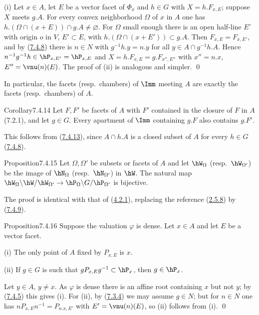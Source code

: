 \documentclass[12pt,a4paper,oneside,english]{smfart}
\makeatletter
\newcommand{\btanchor}[1]{\leavevmode\Hy@raisedlink{\hypertarget{bt:#1}{}}}
\newcommand{\btref}[1]{\hyperlink{bt:#1}{#1}}
\theoremstyle{definition}
\theoremstyle{bt}
\makeatother
\begin{document}
\pf (i) Let $x\in A$, let $E$ be a vector facet of $\Phi_x$ and $h\in G$ with
$X=h.F_{x,E}$; suppose $X$ meets $g.A$. For every convex neighborhood $\Omega$ of
$x$ in $A$ one has $h.(\Omega\cap(x+E))\cap g.A\neq\varnothing$. For $\Omega$ small
enough there is an open half-line $E'$ with origin $o$ in $V$, $E'\subset E$, with
$h.(\Omega\cap(x+E'))\subset g.A$. Then $F_{x,E}=F_{x,E'}$, and by (\btref{7.4.8}) there is
$n\in N$ with $g^{-1}h.y=n.y$ for all $y\in A\cap g^{-1}h.A$. Hence
$n^{-1}g^{-1}h\in\hP_{x,E'}=\hP_{x,E}$ and $X=h.F_{x,E}=g.F_{x'',E''}$ with
$x''=n.x$, $E''=\vnu(n)(E)$. The proof of (ii) is analogous and simpler. \qed

\smallskip
In particular, the facets (resp.\ chambers) of $\Imm$ meeting $A$ are exactly the
facets (resp.\ chambers) of $A$.

\begin{stmt}{Corollary}{7.4.14}\btanchor{7.4.14}
Let $F,F'$ be facets of $A$ with $F'$ contained in the closure of $F$ in $A$
\textup{(7.2.1)}, and let $g\in G$. Every apartment of $\Imm$ containing $g.F$ also
contains $g.F'$.
\end{stmt}

This follows from (\btref{7.4.13}), since $A\cap h.A$ is a closed subset of $A$ for every
$h\in G$ (\btref{7.4.8}).

\begin{stmt}{Proposition}{7.4.15}\btanchor{7.4.15}
Let $\Omega,\Omega'$ be subsets or facets of $A$ and let $\hW_\Omega$ (resp.\
$\hW_{\Omega'}$) be the image of $\hN_\Omega$ (resp.\ $\hN_{\Omega'}$) in $\hW$. The
natural map
$\hW_\Omega\backslash\hW/\hW_{\Omega'}\to\hP_\Omega\backslash G/\hP_{\Omega'}$
is bijective.
\end{stmt}

The proof is identical with that of (\btref{4.2.1}), replacing the reference (\btref{2.5.8}) by
(\btref{7.4.9}).

\begin{stmt}{Proposition}{7.4.16}\btanchor{7.4.16}
Suppose the valuation $\varphi$ is dense. Let $x\in A$ and let $E$ be a vector facet.

(i) The only point of $A$ fixed by $P_{x,E}$ is $x$.

(ii) If $g\in G$ is such that $gP_{x,E}g^{-1}\subset\hP_x$, then $g\in\hP_x$.
\end{stmt}

\pf Let $y\in A$, $y\neq x$. As $\varphi$ is dense there is an affine root containing
$x$ but not $y$; by (\btref{7.4.5}) this gives (i). For (ii), by (\btref{7.3.4}) we may assume
$g\in N$; but for $n\in N$ one has $nP_{x,E}n^{-1}=P_{n.x,E'}$ with
$E'=\vnu(n)(E)$, so (ii) follows from (i). \qed
\end{document}
